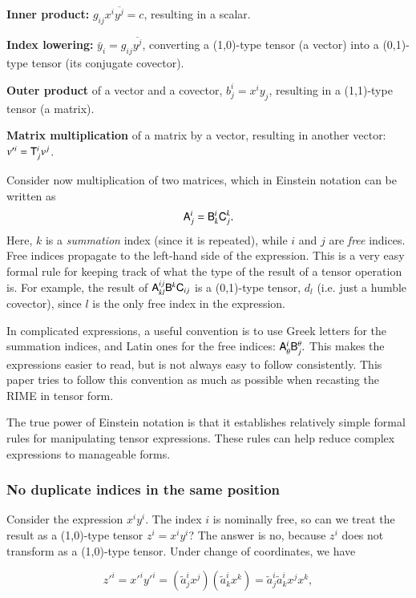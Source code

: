 \documentclass[]{aa}
\begin{document}
{\bf Inner product: } $g_{ij} x^i \overline{y^j} = c$, resulting in a scalar.

{\bf Index lowering:} $\bar y_i = g_{ij} \overline{y^j}$, converting a (1,0)-type tensor (a vector) into a (0,1)-type tensor (its conjugate covector).

{\bf Outer product} of a vector and a covector, $b^i_j = x^i y_j$, resulting in a (1,1)-type tensor (a matrix). 

{\bf Matrix multiplication} of a matrix by a vector, resulting in another vector: $v'^i = \mathsf{T}^i_j v^j$.

Consider now multiplication of two matrices, which in Einstein notation can be written as
\[
\mathsf{A}_{j}^{i}=\mathsf{B}_{k}^{i}\mathsf{C}_{j}^{k}.\]
Here, $k$ is a \emph{summation} index (since it
is repeated), while $i$ and $j$ are \emph{free} indices. Free indices
propagate to the left-hand side of the expression. This is a very
easy formal rule for keeping track of what the type of the result
of a tensor operation is. For example, the result of $\mathsf{A}_{kl}^{ij}\mathsf{B}^{k}\mathsf{C}_{ij}$ is a (0,1)-type 
tensor, $d_{l}$ (i.e. just a humble covector), since $l$ is the only free index in the expression.

In complicated expressions, a useful convention is to use Greek letters for the summation indices, and Latin ones for the free indices:  $\mathsf{A}_{\theta}^{i}\mathsf{B}_{j}^{\theta}.$ This makes the expressions easier to read, but is not always easy to follow consistently. 
This paper tries to follow this convention as much as possible when recasting the RIME in tensor form.

The true power of Einstein notation is that it establishes relatively simple formal rules for manipulating tensor expressions. These rules
can help reduce complex expressions to manageable forms. 

\subsubsection{No duplicate indices in the same position}

Consider the expression $x^i y^i$. The index $i$ is nominally free, so can we treat the result as a (1,0)-type tensor $z^i = x^i y^i$? The answer is no, because $z^i$ does not transform as a (1,0)-type tensor. Under change of coordinates, we have

\[
  z'^i = x'^i y'^i = (\tilde a^i_j x^j) (\tilde a^i_k x^k) = \tilde a^i_j \tilde a^i_k x^j x^k, 
\]
\end{document}
